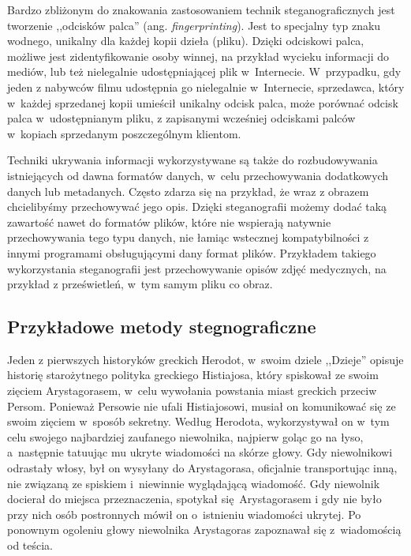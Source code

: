 \documentclass[a4paper, twoside, 12pt]{report}
\begin{document}
        Bardzo zbliżonym do znakowania zastosowaniem technik steganograficznych jest
        tworzenie ,,odcisków palca'' (ang. \emph{fingerprinting}). Jest to specjalny
        typ znaku wodnego, unikalny dla każdej kopii dzieła (pliku). Dzięki odciskowi
        palca, możliwe jest zidentyfikowanie osoby winnej, na przykład wycieku informacji
        do mediów, lub też nielegalnie udostępniającej plik w~Internecie. W~przypadku,
        gdy jeden z nabywców filmu udostępnia go nielegalnie w~Internecie, sprzedawca,
        który w~każdej sprzedanej kopii umieścił unikalny odcisk palca, może porównać
        odcisk palca w~udostępnianym pliku, z zapisanymi wcześniej odciskami palców
        w~kopiach sprzedanym poszczególnym klientom.

        Techniki ukrywania informacji wykorzystywane są także do rozbudowywania
        istniejących od dawna formatów danych, w~celu przechowywania dodatkowych
        danych lub metadanych. Często zdarza się na przykład, że wraz z obrazem
        chcielibyśmy przechowywać jego opis. Dzięki steganografii możemy dodać
        taką zawartość nawet do formatów plików, które nie wspierają natywnie
        przechowywania tego typu danych, nie łamiąc wstecznej kompatybilności z innymi
        programami obsługującymi dany format plików. Przykładem takiego wykorzystania
        steganografii jest przechowywanie opisów zdjęć medycznych, na przykład
        z prześwietleń, w~tym samym pliku co obraz\cite{DISAPPEARINGCRYPTOEMBEDDINGMETDATA}.

        \subsection{Przykładowe metody stegnograficzne}
        Jeden z pierwszych historyków greckich Herodot, w~swoim dziele ,,Dzieje''
        opisuje historię starożytnego polityka greckiego Histiajosa, który spiskował
        ze swoim zięciem Arystagorasem, w~celu wywołania powstania miast greckich
        przeciw Persom\cite{STEGANOGRAPHYINTRO}. Ponieważ Persowie nie ufali Histiajosowi, musiał on komunikować
        się ze swoim zięciem w~sposób sekretny. Według Herodota, wykorzystywał
        on w~tym celu swojego najbardziej zaufanego niewolnika, najpierw goląc
        go na łyso, a~następnie tatuując mu ukryte wiadomości na skórze głowy.
        Gdy niewolnikowi odrastały włosy, był on wysyłany do Arystagorasa, oficjalnie
        transportując inną, nie związaną ze spiskiem i~niewinnie wyglądającą wiadomość.
        Gdy niewolnik docierał do miejsca przeznaczenia, spotykał się Arystagorasem i
        gdy nie było przy nich osób postronnych mówił on o~istnieniu wiadomości ukrytej.
        Po ponownym ogoleniu głowy niewolnika Arystagoras zapoznawał się z~wiadomością
        od teścia.
\end{document}

